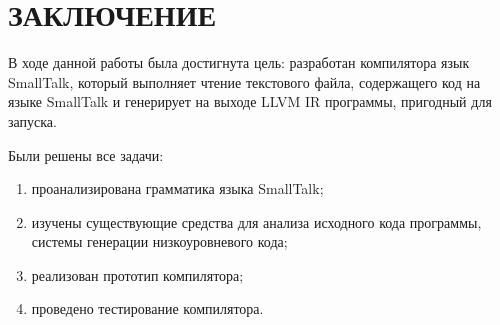 \section*{ЗАКЛЮЧЕНИЕ}
{}

В ходе данной работы была достигнута цель: разработан компилятора язык SmallTalk, который выполняет чтение текстового файла, содержащего код на языке SmallTalk и генерирует на выходе LLVM IR программы, пригодный для запуска. 

Были решены все задачи:
\begin{enumerate}
	\item проанализирована грамматика языка SmallTalk;
	\item изучены существующие средства для анализа исходного кода программы, системы генерации низкоуровневого кода;
	\item реализован прототип компилятора;
	\item проведено тестирование компилятора.
\end{enumerate}

\newpage